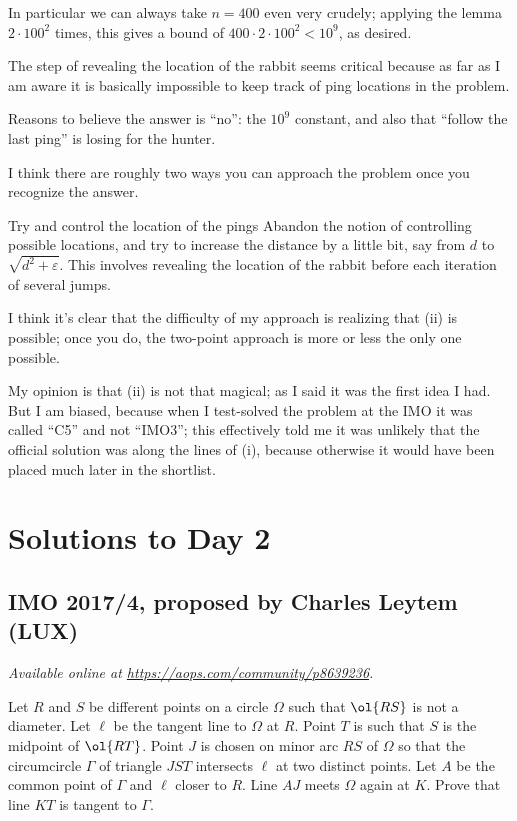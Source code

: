 \documentclass[11pt]{scrartcl}
\begin{document}
In particular we can always take $n = 400$ even very crudely;
applying the lemma $2 \cdot 100^2$ times,
this gives a bound of $400 \cdot 2 \cdot 100^2 < 10^9$, as desired.

\begin{remark*}
  The step of revealing the location of the rabbit seems
  critical because as far as I am aware it is basically
  impossible to keep track of ping locations in the problem.
\end{remark*}

\begin{remark*}
  Reasons to believe the answer is ``no'':
  the $10^9$ constant,
  and also that ``follow the last ping'' is losing for the hunter.
\end{remark*}

\begin{remark*}
  I think there are roughly two ways you can approach the problem
  once you recognize the answer.

  \begin{enumerate}[(i)]
    \ii Try and control the location of the pings
    \ii Abandon the notion of controlling possible locations,
    and try to increase the distance by a little bit,
    say from $d$ to $\sqrt{d^2+\varepsilon}$.
    This involves revealing the location of the rabbit
    before each iteration of several jumps.
  \end{enumerate}
  I think it's clear that the difficulty of
  my approach is realizing that (ii) is possible;
  once you do, the two-point approach is more or less the only one possible.

  My opinion is that (ii) is not that magical;
  as I said it was the first idea I had.
  But I am biased, because when I test-solved the problem
  at the IMO it was called ``C5'' and not ``IMO3'';
  this effectively told me it was unlikely that the official solution
  was along the lines of (i),
  because otherwise it would have been placed much later in the shortlist.
\end{remark*}
\pagebreak

\section{Solutions to Day 2}
\subsection{IMO 2017/4, proposed by Charles Leytem (LUX)}
\textsl{Available online at \url{https://aops.com/community/p8639236}.}
\begin{mdframed}[style=mdpurplebox,frametitle={Problem statement}]
Let $R$ and $S$ be different points on a circle $\Omega$
such that $\ol{RS}$ is not a diameter.
Let $\ell$ be the tangent line to $\Omega$ at $R$.
Point $T$ is such that $S$ is the midpoint of $\ol{RT}$.
Point $J$ is chosen on minor arc $RS$ of $\Omega$ so that
the circumcircle $\Gamma$ of triangle $JST$ intersects $\ell$
at two distinct points.
Let $A$ be the common point of $\Gamma$ and $\ell$ closer to $R$.
Line $AJ$ meets $\Omega$ again at $K$.
Prove that line $KT$ is tangent to $\Gamma$.
\end{mdframed}
\end{document}
